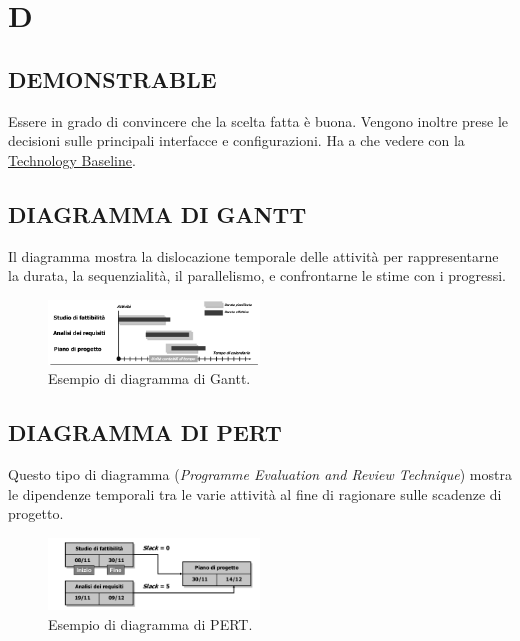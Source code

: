 \newpage
	\section{D} \label{sec:D}
	
		\subsection{DEMONSTRABLE}		\label{demonstrable}
		Essere in grado di convincere che la scelta fatta è buona. Vengono inoltre prese le decisioni sulle principali interfacce e configurazioni. Ha  a che vedere con la \underline{\hyperref[technologybaseline]{Technology Baseline}}.
	
		\subsection{DIAGRAMMA DI GANTT}  \label{gantt}
		Il diagramma mostra la dislocazione temporale delle attività per rappresentarne la durata, la sequenzialità, il parallelismo, e confrontarne le stime con i progressi.
		
		\begin{figure}[H]
			\centering
			\includegraphics[width=0.5\textwidth]{img/gantt}		
			\caption{Esempio di diagramma di Gantt.}
		\end{figure} 
	
		\subsection{DIAGRAMMA DI PERT}  \label{pert}
		Questo tipo di diagramma (\textit{Programme Evaluation and Review Technique}) mostra le dipendenze temporali tra le varie attività al fine di ragionare sulle scadenze di progetto.
		
		\begin{figure}[H]
			\centering
			\includegraphics[width=0.5\textwidth]{img/pert}		
			\caption{Esempio di diagramma di PERT.}
		\end{figure} 
		
